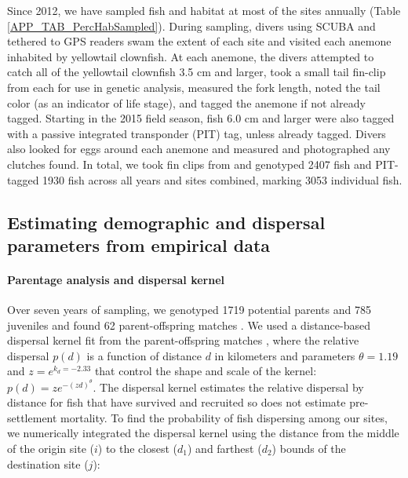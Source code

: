 \documentclass[12pt, oneside]{article}   	%
\begin{document}
Since 2012, we have sampled fish and habitat at most of the sites annually (Table \ref{APP_TAB_PercHabSampled}). During sampling, divers using SCUBA and tethered to GPS readers swam the extent of each site and visited each anemone inhabited by yellowtail clownfish. At each anemone, the divers attempted to catch all of the yellowtail clownfish 3.5 cm and larger, took a small tail fin-clip from each for use in genetic analysis, measured the fork length, noted the tail color (as an indicator of life stage), and tagged the anemone if not already tagged. Starting in the 2015 field season, fish 6.0 cm and larger were also tagged with a passive integrated transponder (PIT) tag, unless already tagged. Divers also looked for eggs around each anemone and measured and photographed any clutches found. In total, we took fin clips from and genotyped 2407 fish and PIT-tagged 1930 fish across all years and sites combined, marking 3053 individual fish. %

\subsection*{Estimating demographic and dispersal parameters from empirical data} 

\paragraph*{Parentage analysis and dispersal kernel}  %

Over seven years of sampling, we genotyped 1719 potential parents and 785 juveniles and found 62 parent-offspring matches \citep[details in][]{catalanoInPrepconnectivity}.
We used a distance-based dispersal kernel fit from the parent-offspring matches \citep{catalanoInPrepconnectivity}, where the relative dispersal $p(d)$ is a function of distance $d$ in kilometers and parameters $\theta = 1.19$ and $z = e^{k_d = -2.33}$ that control the shape and scale of the kernel: $p(d) = ze^{-(zd)^\theta}$. The dispersal kernel estimates the relative dispersal by distance for fish that have survived and recruited so does not estimate pre-settlement mortality. To find the probability of fish dispersing among our sites, we numerically integrated the dispersal kernel using the distance from the middle of the origin site ($i$) to the closest ($d_1$) and farthest ($d_2$) bounds of the destination site ($j$):
\end{document}
